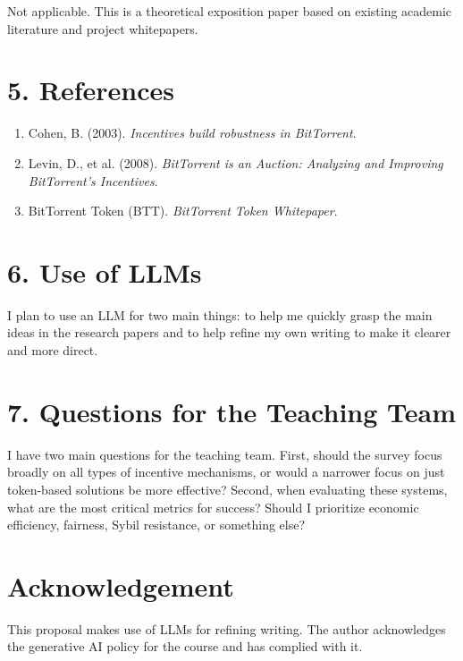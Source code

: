 \documentclass[12pt]{article}
\theoremstyle{definition}
\begin{document}
Not applicable. This is a theoretical exposition paper based on existing academic literature and project whitepapers.

\section*{5. References}
\begin{enumerate}
    \item Cohen, B. (2003). \textit{Incentives build robustness in BitTorrent}.
    \item Levin, D., et al. (2008). \textit{BitTorrent is an Auction: Analyzing and Improving BitTorrent’s Incentives}.
    \item BitTorrent Token (BTT). \textit{BitTorrent Token Whitepaper}.
\end{enumerate}

\section*{6. Use of LLMs}

I plan to use an LLM for two main things: to help me quickly grasp the main ideas in the research papers and to help refine my own writing to make it clearer and more direct.

\section*{7. Questions for the Teaching Team}

I have two main questions for the teaching team. First, should the survey focus broadly on all types of incentive mechanisms, or would a narrower focus on just token-based solutions be more effective? Second, when evaluating these systems, what are the most critical metrics for success? Should I prioritize economic efficiency, fairness, Sybil resistance, or something else?

\section*{Acknowledgement}

This proposal makes use of LLMs for refining writing. The author acknowledges the generative AI policy for the course and has complied with it.
\end{document}
